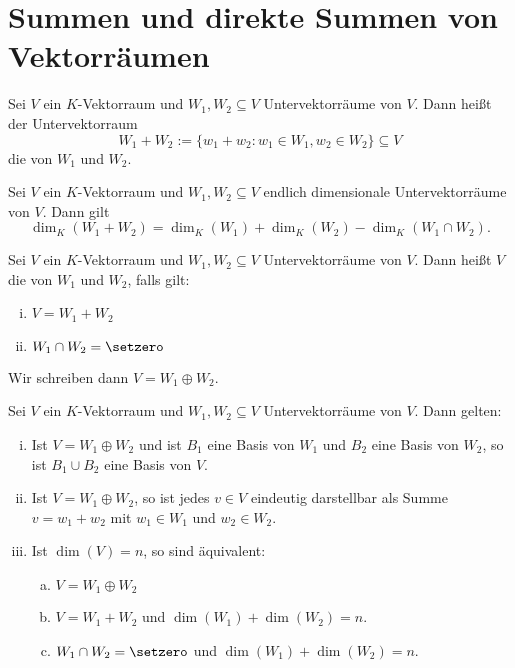 \section{Summen und direkte Summen von Vektorräumen}

\begin{definition}
	\label{def:I.12.1}
	Sei $V$ ein $K$-Vektorraum und $W_1,W_2 \subseteq V$ Untervektorräume von $V$.
	Dann heißt der Untervektorraum
	\[
		W_1 + W_2 := \{w_1 + w_2 : w_1 \in W_1, w_2 \in W_2\} \subseteq V
	\]
	die  von $W_1$ und $W_2$.
\end{definition}

\begin{satz}
	\label{satz:I.12.2}
	Sei $V$ ein $K$-Vektorraum und $W_1,W_2 \subseteq V$ endlich dimensionale Untervektorräume von $V$.
	Dann gilt
	\[
		\dim_K(W_1+W_2) = \dim_K(W_1) + \dim_K(W_2) - \dim_K(W_1 \cap W_2).
	\]
\end{satz}

\begin{definition}
	\label{def:I.12.3}
	Sei $V$ ein $K$-Vektorraum und $W_1,W_2 \subseteq V$ Untervektorräume von $V$.
	Dann heißt $V$ die  von $W_1$ und $W_2$, falls gilt:
	\begin{enumerate}[(i)]
		\item	$V = W_1 + W_2$
		\item	$W_1 \cap W_2 = \setzero$
	\end{enumerate}
	Wir schreiben dann $V = W_1 \oplus W_2$.
\end{definition}

\begin{satz}
	\label{satz:I.12.4}
	Sei $V$ ein $K$-Vektorraum und $W_1,W_2 \subseteq V$ Untervektorräume von $V$.
	Dann gelten:
	\begin{enumerate}[(i)]
		\item Ist $V = W_1 \oplus W_2$ und ist $B_1$ eine Basis von $W_1$ und $B_2$ eine Basis von  $W_2$, so ist $B_1 \cup B_2$ eine Basis von $V$.
		\item Ist $V = W_1 \oplus W_2$, so ist jedes $v \in V$ eindeutig darstellbar als Summe $v = w_1 + w_2$ mit $w_1 \in W_1$ und $w_2 \in W_2$.
		\item Ist $\dim(V) = n$, so sind äquivalent:
		\begin{enumerate}[a)]
			\item $V = W_1 \oplus W_2$
			\item $V = W_1 + W_2$ und $\dim(W_1) + \dim(W_2) = n$.
			\item $W_1 \cap W_2 = \setzero$ und $\dim(W_1) + \dim(W_2) = n$.
		\end{enumerate}
	\end{enumerate}
\end{satz}

